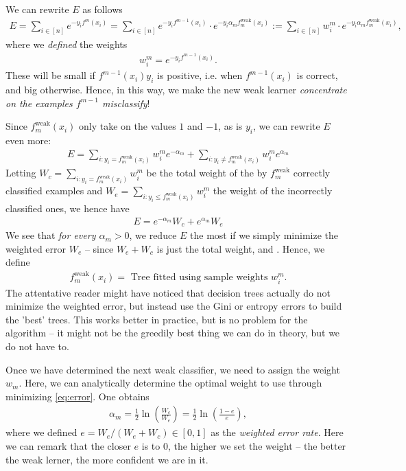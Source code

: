 \documentclass{article}
\newcommand{\weak}{\mathrm{weak}}
\begin{document}
We can rewrite $E$ as follows
\begin{align*}
     E= \sum_{i\in[n]} e^{-y_if^m(x_i)} = \sum_{i\in [n]}e^{-y_if^{m-1}(x_i)} \cdot e^{-y_i\alpha_m f_m^{\weak}(x_i)}:= \sum_{i\in [n]}w_i^m \cdot e^{-y_i\alpha_m f_m^{\weak}(x_i)},
\end{align*}
where we \emph{defined} the weights
\begin{align} \label{eq:weights}
    w_i^m = e^{-y_if^{m-1}(x_i)}.
\end{align}
These will be small if $f^{m-1}(x_i)y_i$ is positive, i.e. when $f^{m-1}(x_i)$ is correct, and big otherwise. Hence, in this way, we make the new weak learner \emph{concentrate on the examples $f^{m-1}$ misclassify}!

Since $f^\weak_m(x_i)$ only take on the values $1$ and $-1$, as is $y_i$, we can rewrite $E$ even more:
\begin{align*}
    E= \sum_{i : y_i = f_m^\weak(x_i)}w_i^m e^{-\alpha_m} + \sum_{i : y_i \neq f_m^\weak(x_i)}w_i^m e^{\alpha_m} 
\end{align*}
Letting $W_c= \sum_{i : y_i = f_m^\weak(x_i)}w_i^m$ be the total weight of the by $f_m^\weak$ correctly classified examples and $W_e =  \sum_{i : y_i \leq f_m^\weak(x_i)}w_i^m$ the weight of the incorrectly classified ones, we hence have
\begin{align} \label{eq:error}
    E = e^{-\alpha_m} W_c + e^{\alpha_m}W_e
\end{align}
We see that \emph{for every $\alpha_m>0$}, we reduce $E$ the most if we simply minimize the weighted error $W_e$ -- since $W_e+W_c$ is just the total weight, and . Hence, we define
\begin{align} \label{eq:weak tree}
    f_m^\weak(x_i) = \text{ Tree fitted using sample weights $w_i^m$.}
\end{align}
The attentative reader might have noticed that decision trees actually do not minimize the weighted error, but instead use the Gini or entropy errors to build the 'best' trees. This works better in practice, but is no problem for the algorithm -- it might not be the greedily best thing we can do in theory, but we do not have to.

Once we have determined the next weak classifier, we need to assign the weight $w_m$. Here, we can analytically determine the optimal weight to use through minimizing \eqref{eq:error}. One obtains
\begin{align} \label{eq:optimal_alpha}
    \alpha_m = \frac{1}{2}\ln\left(\frac{W_c}{W_e}\right) = \frac{1}{2}\ln\left(\frac{1-e}{e}\right),
\end{align}
where we defined $e=W_e/(W_e+W_c)\in [0,1]$ as the \emph{weighted error rate}. Here we can remark that the closer $e$ is to $0$, the higher we set the weight -- the better the weak lerner, the more confident we are in it. 
\end{document}
